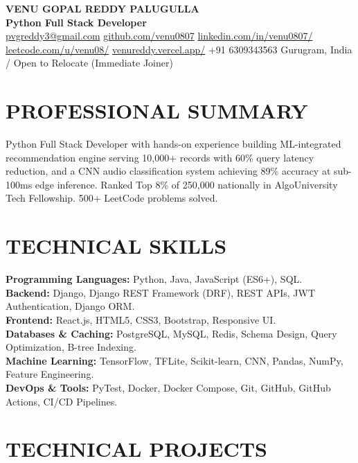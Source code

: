 \documentclass[11pt,a4paper]{article}
\begin{document}
\begin{center}
    {\LARGE \textbf{VENU GOPAL REDDY PALUGULLA}} \\
    \vspace{1pt}
     {\bfseries\small Python Full Stack Developer}
     \\
    \vspace{1pt}
    \href{mailto:pvgreddy3@gmail.com}{pvgreddy3@gmail.com} \;\; \;\; \href{https://github.com/venu0807}{github.com/venu0807} \;\; \;\; 
    \href{https://www.linkedin.com/in/venu0807/}{linkedin.com/in/venu0807/} \;\; \;\; 
    \href{https://leetcode.com/u/venu08/}{leetcode.com/u/venu08/} \;\; \;\;
    \href{https://venureddy.vercel.app/}{venureddy.vercel.app/} \;\; \;\;
    +91 6309343563 \;\; \;\;
    Gurugram, India / Open to Relocate (Immediate Joiner)
\end{center}

\section*{PROFESSIONAL SUMMARY}

Python Full Stack Developer with hands-on experience building ML-integrated recommendation engine serving 10,000+ records with 60\% query latency reduction, and a CNN audio classification system achieving 89\% accuracy at sub-100ms edge inference. Ranked Top 8\% of 250,000 nationally in AlgoUniversity Tech Fellowship. 500+ LeetCode problems solved.

\section*{TECHNICAL SKILLS}
\textbf{Programming Languages:} Python, Java, JavaScript (ES6+), SQL. \\
\textbf{Backend:} Django, Django REST Framework (DRF), REST APIs, JWT Authentication, Django ORM. \\
\textbf{Frontend:} React.js, HTML5, CSS3, Bootstrap, Responsive UI. \\
\textbf{Databases \& Caching:} PostgreSQL, MySQL, Redis, Schema Design, Query Optimization, B-tree Indexing. \\
\textbf{Machine Learning:} TensorFlow, TFLite, Scikit-learn, CNN, Pandas, NumPy, Feature Engineering. \\
\textbf{DevOps \& Tools:} PyTest, Docker, Docker Compose, Git, GitHub, GitHub Actions, CI/CD Pipelines.

\section*{TECHNICAL PROJECTS}
\end{document}
